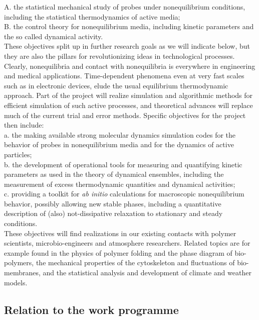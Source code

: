  A. the statistical mechanical study of probes under nonequilibrium conditions, including the statistical thermodynamics of active media;\\
 B. the control theory for nonequilibrium media, including kinetic parameters and the so called dynamical activity.\\
 These objectives split up in further research goals as we will indicate below, but they are also the pillars for revolutionizing ideas in technological processes.  Clearly, nonequilibria and contact with nonequilibria is everywhere in engineering and medical applications.  Time-dependent phenomena even at very fast scales such as in electronic devices, elude the usual equilibrium thermodynamic approach. Part of the project will realize simulation and algorithmic methods for efficient simulation of such active processes, and theoretical advances will replace much of the current trial and error methods.
 Specific objectives for the project then include:\\
 a. the making available strong molecular dynamics simulation codes for the behavior of probes in nonequilibrium media and for the dynamics of active particles;\\
 b. the development of operational tools for measuring and quantifying kinetic parameters as used in the theory of dynamical ensembles, including the measurement of excess thermodynamic quantities and dynamical activities;\\
 c. providing a toolkit for {\it ab initio} calculations for macroscopic nonequilibrium behavior, possibly allowing new stable phases, including a quantitative description of (also) not-dissipative relaxation to stationary and steady conditions.\\
 These objectives will find realizations in our existing contacts with polymer scientists, microbio-engineers and atmosphere researchers.   Related topics are for example found in the physics of polymer folding and the phase diagram of bio-polymers, the mechanical properties of the cytoskeleton and fluctuations of bio-membranes, and the statistical analysis and development of climate and weather models.  


\subsection{Relation to the work programme}\label{sec:relation-wp}


